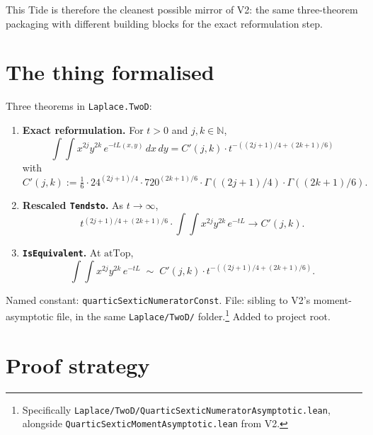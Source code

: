 \documentclass[11pt]{article}
\begin{document}
This Tide is therefore the cleanest possible mirror of V2: the same
three-theorem packaging with different building blocks for the exact
reformulation step.

\section{The thing formalised}

Three theorems in \texttt{Laplace.TwoD}:

\begin{enumerate}[leftmargin=1.5em]
\item \textbf{Exact reformulation.} For $t > 0$ and $j, k \in
  \mathbb N$,
  $$
    \int\!\int x^{2j} y^{2k}\,e^{-tL(x, y)}\,dx\,dy
    = C'(j, k)\cdot t^{-((2j+1)/4 + (2k+1)/6)}
  $$
  with
  $$
    C'(j, k) := \tfrac{1}{6}\cdot 24^{(2j+1)/4}\cdot 720^{(2k+1)/6}
      \cdot \Gamma((2j+1)/4)\cdot \Gamma((2k+1)/6).
  $$
\item \textbf{Rescaled \texttt{Tendsto}.} As $t \to \infty$,
  $$
    t^{(2j+1)/4 + (2k+1)/6}\cdot \int\!\int x^{2j} y^{2k}\,e^{-tL}
    \to C'(j, k).
  $$
\item \textbf{\texttt{IsEquivalent}.} At $\mathrm{atTop}$,
  $$
    \int\!\int x^{2j} y^{2k}\,e^{-tL}
    \;\sim\; C'(j, k)\cdot t^{-((2j+1)/4 + (2k+1)/6)}.
  $$
\end{enumerate}

Named constant: \texttt{quarticSexticNumeratorConst}. File:
sibling to V2's moment-asymptotic file, in the same
\texttt{Laplace/TwoD/} folder.\footnote{Specifically
\texttt{Laplace/TwoD/QuarticSexticNumeratorAsymptotic.lean}, alongside
\texttt{QuarticSexticMomentAsymptotic.lean} from V2.} Added to
project root.

\section{Proof strategy}
\end{document}
